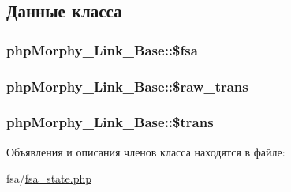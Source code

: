 \subsection{Данные класса}
\hypertarget{classphpMorphy__Link__Base_a920f7335f125f823a1f9062194caac9f}{
\subsubsection[{\$fsa}]{\setlength{\rightskip}{0pt plus 5cm}phpMorphy\_\-Link\_\-Base::\$fsa}}
\label{classphpMorphy__Link__Base_a920f7335f125f823a1f9062194caac9f}
\hypertarget{classphpMorphy__Link__Base_a0f846a082c2dcfa293aae76938772a62}{
\subsubsection[{\$raw\_\-trans}]{\setlength{\rightskip}{0pt plus 5cm}phpMorphy\_\-Link\_\-Base::\$raw\_\-trans}}
\label{classphpMorphy__Link__Base_a0f846a082c2dcfa293aae76938772a62}
\hypertarget{classphpMorphy__Link__Base_a52333ff6dfa004976aa1a8fe62d3b57c}{
\subsubsection[{\$trans}]{\setlength{\rightskip}{0pt plus 5cm}phpMorphy\_\-Link\_\-Base::\$trans}}
\label{classphpMorphy__Link__Base_a52333ff6dfa004976aa1a8fe62d3b57c}


Объявления и описания членов класса находятся в файле:\begin{DoxyCompactItemize}
\item 
fsa/\hyperlink{fsa__state_8php}{fsa\_\-state.php}\end{DoxyCompactItemize}
